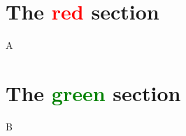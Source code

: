 \documentclass{beamer}
\begin{document}
\section{The \protect\textcolor{red}{red} section}
\begin{frame}
 A
\end{frame}

\section{The \protect\textcolor{green}{green} section}
\begin{frame}
B
\end{frame}
\end{document}
